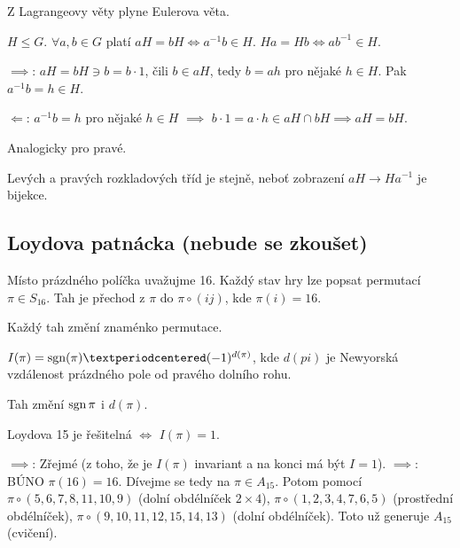 \documentclass[12pt]{article}                   %
\begin{document}
        \begin{poznamka}
            Z Lagrangeovy věty plyne Eulerova věta.
        \end{poznamka}

        \begin{tvrzeni}
            $H ≤ G$. $\forall a, b \in G$ platí $aH = bH \Leftrightarrow a^{-1}b \in H$. $Ha = Hb \Leftrightarrow ab^{-1} \in H$.

            \begin{dukazin}
                $\implies$: $aH = bH \ni b = b·1$, čili $b \in aH$, tedy $b = ah$ pro nějaké $h \in H$. Pak $a^{-1}b = h \in H$.

                $\Leftarrow$: $a^{-1}b = h$ pro nějaké $h \in H$ $\implies$ $b·1 = a·h \in aH \cap bH \implies aH = bH$.

                Analogicky pro pravé.
            \end{dukazin}
        \end{tvrzeni}

        \begin{dusledek}
            Levých a pravých rozkladových tříd je stejně, neboť zobrazení $aH \rightarrow Ha^{-1}$ je bijekce.
        \end{dusledek}

    \subsection{Loydova patnácka (nebude se zkoušet)}
        Místo prázdného políčka uvažujme 16. Každý stav hry lze popsat permutací $\pi \in S_{16}$. Tah je přechod z $\pi$ do $\pi\circ(ij)$, kde $\pi(i) = 16$.

        \begin{pozorovani}
            Každý tah změní znaménko permutace.
        \end{pozorovani}

        \begin{definice}
            $I(\pi) = \sgn(\pi)·(-1)^{d(\pi)}$, kde $d(pi)$ je Newyorská vzdálenost prázdného pole od pravého dolního rohu.

            \begin{dukazin}[Invariant]
                Tah změní $\operatorname{sgn} \pi$ i $d(\pi)$.
            \end{dukazin}
        \end{definice}

        \begin{veta}
            Loydova 15 je řešitelná $\Leftrightarrow$ $I(\pi) = 1$.

            \begin{dukazin}
                $\implies$: Zřejmé (z toho, že je $I(\pi)$ invariant a na konci má být $I = 1$). $\implies$: BÚNO $\pi(16) = 16$. Dívejme se tedy na $\pi \in A_{15}$. Potom pomocí $\pi \circ (5, 6, 7, 8, 11, 10, 9)$ (dolní obdélníček $2 \times 4$), $\pi \circ (1, 2, 3, 4, 7, 6, 5)$ (prostřední obdélníček), $\pi \circ (9, 10, 11, 12, 15, 14, 13)$ (dolní obdélníček). Toto už generuje $A_{15}$ (cvičení).
            \end{dukazin}
        \end{veta}
\end{document}
